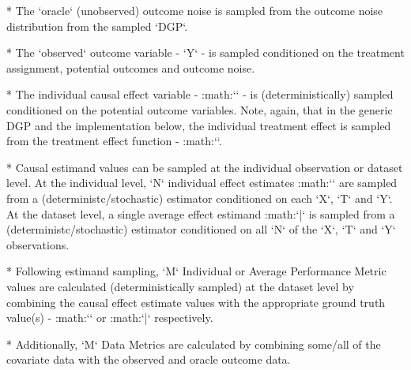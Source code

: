 \documentclass[../main.tex]{subfiles}
\begin{document}
  * The `oracle` (unobserved) outcome noise is sampled from the outcome noise distribution from the sampled `DGP`.

  * The `observed` outcome variable - `Y` - is sampled conditioned on the treatment assignment, potential outcomes and outcome noise.

  * The individual causal effect variable - :math:`\tau` - is (deterministically) sampled conditioned on the potential outcome variables. Note, again, that in the generic DGP and the implementation below, the individual treatment effect is sampled from the treatment effect function - :math:`\tau`.

* Causal estimand values can be sampled at the individual observation or dataset level. At the individual level, `N` individual effect estimates :math:`\hat{\tau}` are sampled from a (deterministc/stochastic) estimator conditioned on each `X`, `T` and `Y`. At the dataset level, a single average effect estimand :math:`\bar{\hat{\tau}}` is sampled from a (deterministc/stochastic) estimator conditioned on all `N` of the `X`, `T` and `Y` observations.

* Following estimand sampling, `M` Individual or Average Performance Metric values are calculated (deterministically sampled) at the dataset level by combining the causal effect estimate values with the appropriate ground truth value(s) - :math:`\tau` or :math:`\bar{\tau}` respectively.

* Additionally, `M` Data Metrics are calculated by combining some/all of the covariate data with the observed and oracle outcome data.
\end{document}
